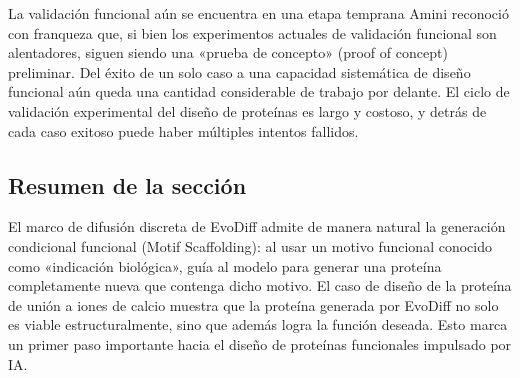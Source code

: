 \begin{warningbox}{La validación funcional aún se encuentra en una etapa temprana}
Amini reconoció con franqueza que, si bien los experimentos actuales de validación funcional son alentadores, siguen siendo una «prueba de concepto» (proof of concept) preliminar. Del éxito de un solo caso a una capacidad sistemática de diseño funcional aún queda una cantidad considerable de trabajo por delante. El ciclo de validación experimental del diseño de proteínas es largo y costoso, y detrás de cada caso exitoso puede haber múltiples intentos fallidos.
\end{warningbox}

\subsection{Resumen de la sección}

El marco de difusión discreta de EvoDiff admite de manera natural la generación condicional funcional (Motif Scaffolding): al usar un motivo funcional conocido como «indicación biológica», guía al modelo para generar una proteína completamente nueva que contenga dicho motivo. El caso de diseño de la proteína de unión a iones de calcio muestra que la proteína generada por EvoDiff no solo es viable estructuralmente, sino que además logra la función deseada. Esto marca un primer paso importante hacia el diseño de proteínas funcionales impulsado por IA.
